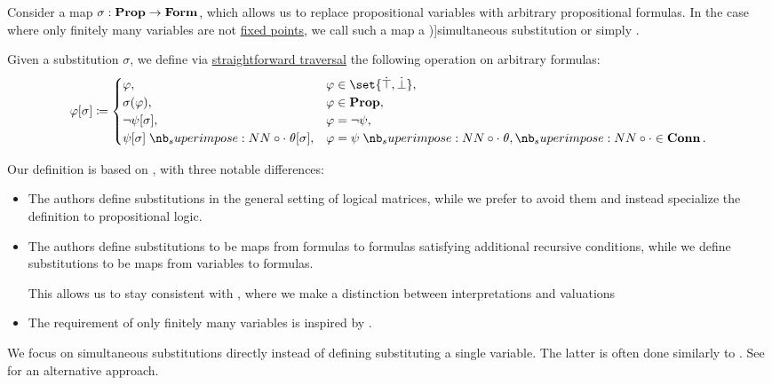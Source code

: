 \begin{definition}\label{def:propositional_substitution}\mimprovised
  Consider a map \( \sigma: \op*{Prop} \to \op*{Form} \), which allows us to replace propositional variables with arbitrary propositional formulas. In the case where only finitely many variables are not \hyperref[def:fixed_point]{fixed points}, we call such a map a \term[ru=одновременная замена (\cite[23]{Герасимов2011Вычислимость})]{simultaneous substitution} or simply .

  Given a substitution \( \sigma \), we define via \hyperref[rem:straightforward_traversal]{straightforward traversal} the following operation on arbitrary formulas:
  \begin{equation*}
    \varphi[\sigma] \coloneqq \begin{cases}
      \varphi,                              &\varphi \in \set{ \syntop, \synbot }, \\
      \sigma(\varphi),                      &\varphi \in \op*{Prop}, \\
      \neg \psi[\sigma],                    &\varphi = \neg \psi, \\
      \psi[\sigma] \syncirc \theta[\sigma], &\varphi = \psi \syncirc \theta, {\syncirc} \in \op*{Conn}. \\
    \end{cases}
  \end{equation*}
\end{definition}
\begin{comments}
  \item Our definition is based on , with three notable differences:
  \begin{itemize}
    \item The authors define substitutions in the general setting of logical matrices, while we prefer to avoid them and instead specialize the definition to propositional logic.

    \item The authors define substitutions to be maps from formulas to formulas satisfying additional recursive conditions, while we define substitutions to be maps from variables to formulas.

    This allows us to stay consistent with , where we make a distinction between interpretations and valuations

    \item The requirement of only finitely many variables is inspired by .
  \end{itemize}

  \item We focus on simultaneous substitutions directly instead of defining substituting a single variable. The latter is often done similarly to . See  for an alternative approach.
\end{comments}

